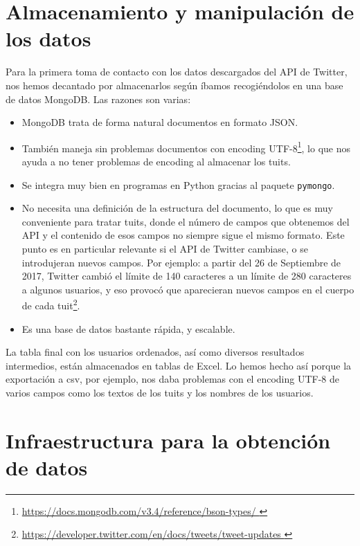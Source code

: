 \section{Almacenamiento y manipulación de los datos}
Para la primera toma de contacto con los datos descargados del API de Twitter, nos hemos decantado por almacenarlos según íbamos recogiéndolos en una base de datos MongoDB. Las razones son varias:
\begin{itemize}
\item MongoDB trata de forma natural documentos en formato JSON.
\item También maneja sin problemas documentos con encoding UTF-8\footnote{
\url{https://docs.mongodb.com/v3.4/reference/bson-types/ }}, lo que nos ayuda a no tener problemas de encoding al
almacenar los tuits.
\item Se integra muy bien en programas en Python gracias al paquete {\tt pymongo}.
\item No necesita una definición de la estructura del documento, lo que es muy conveniente
para tratar tuits, donde el número de campos que obtenemos del API y el contenido de esos campos no siempre
sigue el mismo formato. Este punto es en particular relevante si el API de Twitter cambiase, o se introdujeran nuevos 
campos. Por ejemplo: a partir del 26 de Septiembre de 2017,  Twitter cambió el límite de 140 caracteres
a un límite de 280 caracteres a algunos usuarios, y eso provocó que aparecieran nuevos campos en el cuerpo de cada
tuit\footnote{\url{https://developer.twitter.com/en/docs/tweets/tweet-updates }}.
\item Es una base de datos bastante rápida, y escalable.
\end{itemize}

La tabla final con los usuarios ordenados, así como diversos resultados intermedios, están almacenados en tablas
de Excel. Lo hemos hecho así porque la exportación a csv, por ejemplo, nos daba problemas con el 
encoding UTF-8 de varios campos como los textos de los tuits y los nombres de los usuarios.



\section{Infraestructura para la obtención de datos}

